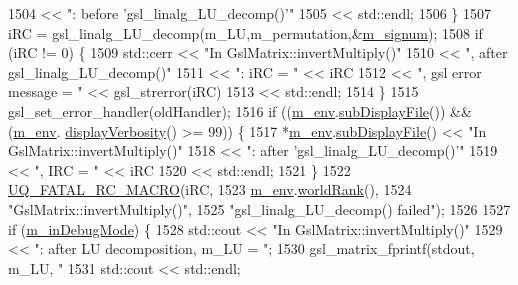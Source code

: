 \begin{DoxyCode}
{1504                               << \textcolor{stringliteral}{": before 'gsl\_linalg\_LU\_decomp()'"}
1505                               << std::endl;
1506     \}
1507     iRC = gsl\_linalg\_LU\_decomp(m\_LU,m\_permutation,&\hyperlink{class_q_u_e_s_o_1_1_gsl_matrix_a591c6afd472ae02dd79e3a109ded4d51}{m\_signum}); 
1508     \textcolor{keywordflow}{if} (iRC != 0) \{
1509       std::cerr << \textcolor{stringliteral}{"In GslMatrix::invertMultiply()"}
1510                 << \textcolor{stringliteral}{", after gsl\_linalg\_LU\_decomp()"}
1511                 << \textcolor{stringliteral}{": iRC = "} << iRC
1512                 << \textcolor{stringliteral}{", gsl error message = "} << gsl\_strerror(iRC)
1513                 << std::endl;
1514     \} 
1515     gsl\_set\_error\_handler(oldHandler);
1516     \textcolor{keywordflow}{if} ((\hyperlink{class_q_u_e_s_o_1_1_matrix_a247fb0fc0b87fecdee054bb4660b68e8}{m\_env}.\hyperlink{class_q_u_e_s_o_1_1_base_environment_a8a0064746ae8dddfece4229b9ad374d6}{subDisplayFile}()) && (\hyperlink{class_q_u_e_s_o_1_1_matrix_a247fb0fc0b87fecdee054bb4660b68e8}{m\_env}.
      \hyperlink{class_q_u_e_s_o_1_1_base_environment_a1fe5f244fc0316a0ab3e37463f108b96}{displayVerbosity}() >= 99)) \{
1517       *\hyperlink{class_q_u_e_s_o_1_1_matrix_a247fb0fc0b87fecdee054bb4660b68e8}{m\_env}.\hyperlink{class_q_u_e_s_o_1_1_base_environment_a8a0064746ae8dddfece4229b9ad374d6}{subDisplayFile}() << \textcolor{stringliteral}{"In GslMatrix::invertMultiply()"}
1518                               << \textcolor{stringliteral}{": after 'gsl\_linalg\_LU\_decomp()'"}
1519                               << \textcolor{stringliteral}{", IRC = "} << iRC
1520                               << std::endl;
1521     \}
1522     \hyperlink{_defines_8h_aa9107e1a9a5197371a412db3fa349988}{UQ\_FATAL\_RC\_MACRO}(iRC,
1523                       \hyperlink{class_q_u_e_s_o_1_1_matrix_a247fb0fc0b87fecdee054bb4660b68e8}{m\_env}.\hyperlink{class_q_u_e_s_o_1_1_base_environment_a78b57112bbd0e6dd0e8afec00b40ffa7}{worldRank}(),
1524                       \textcolor{stringliteral}{"GslMatrix::invertMultiply()"},
1525                       \textcolor{stringliteral}{"gsl\_linalg\_LU\_decomp() failed"});
1526 
1527     \textcolor{keywordflow}{if} (\hyperlink{class_q_u_e_s_o_1_1_matrix_a3384d3fc1a1058fce9191b0d74653911}{m\_inDebugMode}) \{
1528       std::cout << \textcolor{stringliteral}{"In GslMatrix::invertMultiply()"}
1529                 << \textcolor{stringliteral}{": after LU decomposition, m\_LU = "};
1530       gsl\_matrix\_fprintf(stdout, m\_LU, \textcolor{stringliteral}{"%
1531       std::cout << std::endl;
}}
\end{DoxyCode}
